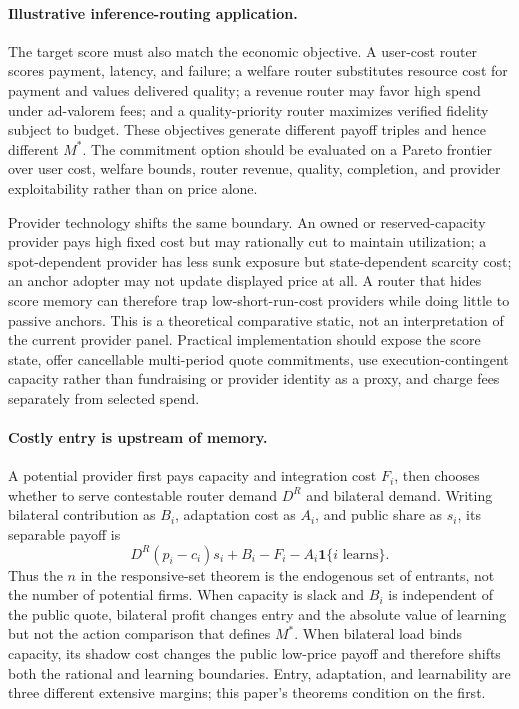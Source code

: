 \documentclass[10pt,twocolumn]{article}
\begin{document}
\paragraph{Illustrative inference-routing application.}
The target score must also match the economic objective.  A user-cost router
scores payment, latency, and failure; a welfare router substitutes resource cost
for payment and values delivered quality; a revenue router may favor high spend
under ad-valorem fees; and a quality-priority router maximizes verified fidelity
subject to budget.  These objectives generate different payoff triples and
hence different $M^*$.  The commitment option should be evaluated on a Pareto
frontier over user cost, welfare bounds, router revenue, quality, completion,
and provider exploitability rather than on price alone.

Provider technology shifts the same boundary.  An owned or reserved-capacity
provider pays high fixed cost but may rationally cut to maintain utilization; a
spot-dependent provider has less sunk exposure but state-dependent scarcity
cost; an anchor adopter may not update displayed price at all.  A router that
hides score memory can therefore trap low-short-run-cost providers while doing
little to passive anchors.  This is a theoretical comparative static, not an
interpretation of the current provider panel.  Practical implementation should
expose the score
state, offer cancellable multi-period quote commitments, use
execution-contingent capacity rather than fundraising or provider identity as a
proxy, and charge fees separately from selected spend.

\paragraph{Costly entry is upstream of memory.}
A potential provider first pays capacity and integration cost $F_i$, then
chooses whether to serve contestable router demand $D^R$ and bilateral demand.
Writing bilateral contribution as $B_i$, adaptation cost as $A_i$, and public
share as $s_i$, its separable payoff is
\[
 D^R(p_i-c_i)s_i+B_i-F_i-A_i\mathbf 1\{i\text{ learns}\}.
\]
Thus the $n$ in the responsive-set theorem is the endogenous set of entrants,
not the number of potential firms.  When capacity is slack and $B_i$ is
independent of the public quote, bilateral profit changes entry and the absolute
value of learning but not the action comparison that defines $M^*$.  When
bilateral load binds capacity, its shadow cost changes the public low-price
payoff and therefore shifts both the rational and learning boundaries.  Entry,
adaptation, and learnability are three different extensive margins; this paper's
theorems condition on the first.
\end{document}
